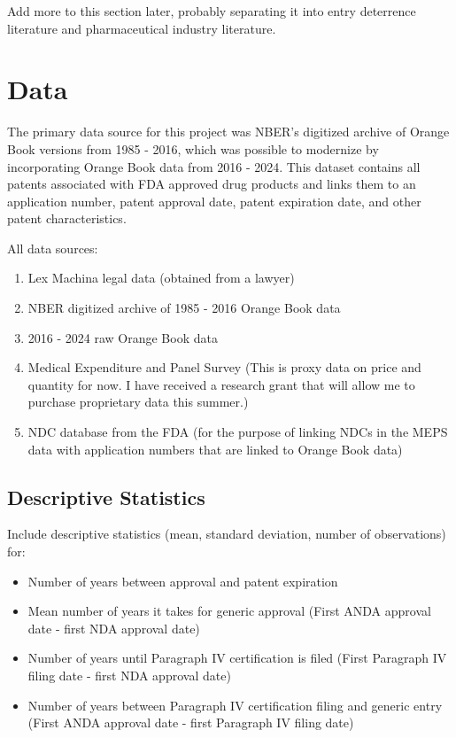 \documentclass[12pt,a4paper]{article}
\begin{document}
\vskip0.2in

Add more to this section later, probably separating it into entry deterrence literature and pharmaceutical industry literature.

\section{Data}

The primary data source for this project was NBER's digitized archive of Orange Book versions from 1985 - 2016, which was possible to modernize by incorporating Orange Book data from 2016 - 2024. This dataset contains all patents associated with FDA approved drug products and links them to an application number, patent approval date, patent expiration date, and other patent characteristics.

\vskip0.2in

All data sources:
\begin{enumerate}
    \item Lex Machina legal data (obtained from a lawyer)
    \item NBER digitized archive of 1985 - 2016 Orange Book data
    \item 2016 - 2024 raw Orange Book data
    \item Medical Expenditure and Panel Survey (This is proxy data on price and quantity for now. I have received a research grant that will allow me to purchase proprietary data this summer.)
    \item NDC database from the FDA (for the purpose of linking NDCs in the MEPS data with application numbers that are linked to Orange Book data)
    
\end{enumerate}

\subsection{Descriptive Statistics}

Include descriptive statistics (mean, standard deviation, number of observations) for:
\begin{itemize}
    \item Number of years between approval and patent expiration
    \item Mean number of years it takes for generic approval (First ANDA approval date - first NDA approval date)
    \item Number of years until Paragraph IV certification is filed (First Paragraph IV filing date - first NDA approval date)
    \item Number of years between Paragraph IV certification filing and generic entry (First ANDA approval date - first Paragraph IV filing date)
\end{itemize}
\end{document}
